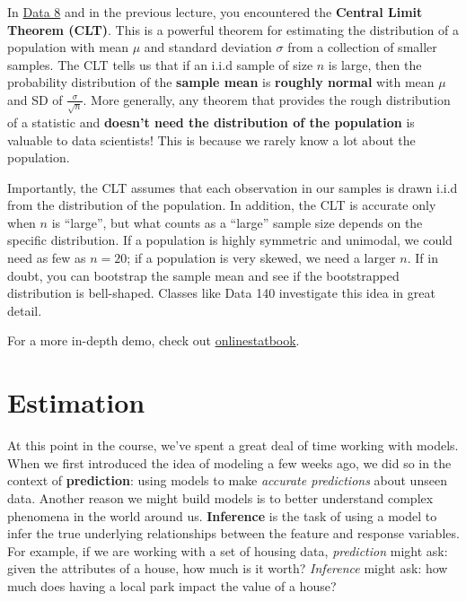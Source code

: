 \documentclass[
  letterpaper,
  DIV=11,
  numbers=noendperiod]{scrreprt}
\begin{document}
In
\href{https://inferentialthinking.com/chapters/14/4/Central_Limit_Theorem.html?}{Data
8} and in the previous lecture, you encountered the \textbf{Central
Limit Theorem (CLT)}. This is a powerful theorem for estimating the
distribution of a population with mean \(\mu\) and standard deviation
\(\sigma\) from a collection of smaller samples. The CLT tells us that
if an i.i.d sample of size \(n\) is large, then the probability
distribution of the \textbf{sample mean} is \textbf{roughly normal} with
mean \(\mu\) and SD of \(\frac{\sigma}{\sqrt{n}}\). More generally, any
theorem that provides the rough distribution of a statistic and
\textbf{doesn't need the distribution of the population} is valuable to
data scientists! This is because we rarely know a lot about the
population.

Importantly, the CLT assumes that each observation in our samples is
drawn i.i.d from the distribution of the population. In addition, the
CLT is accurate only when \(n\) is ``large'', but what counts as a
``large'' sample size depends on the specific distribution. If a
population is highly symmetric and unimodal, we could need as few as
\(n=20\); if a population is very skewed, we need a larger \(n\). If in
doubt, you can bootstrap the sample mean and see if the bootstrapped
distribution is bell-shaped. Classes like Data 140 investigate this idea
in great detail.

For a more in-depth demo, check out
\href{https://onlinestatbook.com/stat_sim/sampling_dist/}{onlinestatbook}.

\section{Estimation}\label{estimation}

At this point in the course, we've spent a great deal of time working
with models. When we first introduced the idea of modeling a few weeks
ago, we did so in the context of \textbf{prediction}: using models to
make \emph{accurate predictions} about unseen data. Another reason we
might build models is to better understand complex phenomena in the
world around us. \textbf{Inference} is the task of using a model to
infer the true underlying relationships between the feature and response
variables. For example, if we are working with a set of housing data,
\emph{prediction} might ask: given the attributes of a house, how much
is it worth? \emph{Inference} might ask: how much does having a local
park impact the value of a house?
\end{document}
